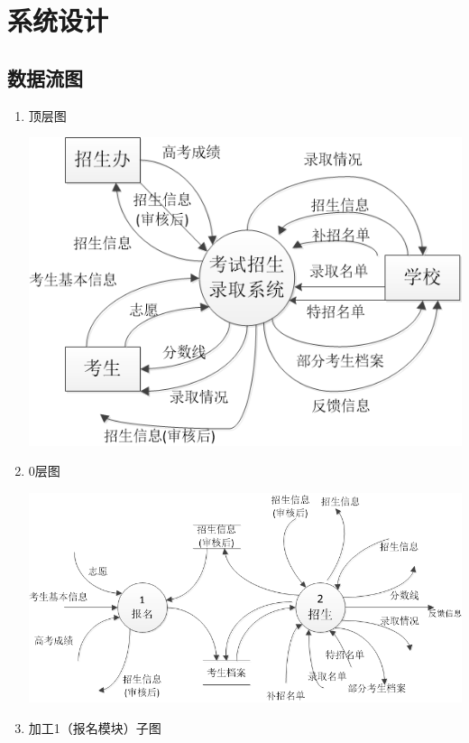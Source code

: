 \documentclass[CJK,utf8]{ctexrep}
\begin{document}
\section*{系统设计}

\subsection*{数据流图}

\begin{enumerate}
	\item 顶层图
	
	\includegraphics[scale=0.75]{DataFlowDiagram/顶层图.png}
	
	\item 0层图
	
	\includegraphics[scale=0.5]{DataFlowDiagram/0层图.png}
	
	\item 加工1（报名模块）子图
	

\end{enumerate}
\end{document}
